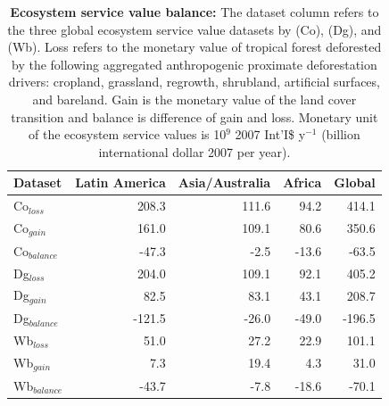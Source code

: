 		\begin{table}[ht]
			\centering
			\caption[Ecosystem service value balance]{\textbf{Ecosystem service value balance:} The dataset column refers to the three global ecosystem service value datasets by \citet{Costanza2014} (Co), \citet{Groot2012} (Dg), and \citet{Siikamaki2015} (Wb). Loss refers to the monetary value of tropical forest deforested by the following aggregated anthropogenic proximate deforestation drivers: cropland, grassland, regrowth, shrubland, artificial surfaces, and bareland. Gain is the monetary value of the land cover transition and balance is difference of gain and loss. Monetary unit of the ecosystem service values is 10$^{9}$ 2007 Int'I\$ y$^{-1}$ (billion international dollar 2007 per year).}
			\label{tab:esv_results}
			\begin{tabular}{lrrrr}
				\hline
				Dataset & Latin America & Asia/Australia & Africa & Global\\
				\hline
				Co$_{loss}$ & 208.3 & 111.6 & 94.2 & 414.1 \\
				Co$_{gain}$ & 161.0 & 109.1 & 80.6 & 350.6 \\
				Co$_{balance}$ & -47.3 & -2.5 & -13.6 & -63.5\\
				Dg$_{loss}$ & 204.0 & 109.1 & 92.1 & 405.2\\
				Dg$_{gain}$ & 82.5 & 83.1 & 43.1 & 208.7\\
				Dg$_{balance}$ & -121.5 & -26.0 & -49.0 & -196.5\\
				Wb$_{loss}$ & 51.0 & 27.2 & 22.9 & 101.1\\
				Wb$_{gain}$ & 7.3 & 19.4 & 4.3 & 31.0 \\
				Wb$_{balance}$ & -43.7 & -7.8 & -18.6 & -70.1 \\
				\hline
			\end{tabular}
		\end{table}

